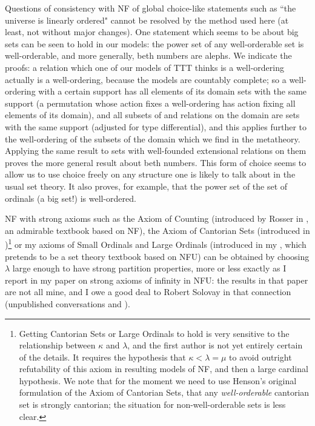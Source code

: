 \documentclass[112pt]{article}
\theoremstyle{definition}
\theoremstyle{remark}
\begin{document}
Questions of consistency with NF of global choice-like statements such as ``the universe is linearly ordered"  cannot be resolved by the method used here (at least, not without major changes).  One statement which seems to be about big sets can be seen to hold in our models:  the power set of any well-orderable set is well-orderable, and more generally, beth numbers are alephs.  We indicate the proofs:  a relation which one of our models of TTT thinks is a well-ordering actually is a well-ordering, because the models are countably complete;  so a well-ordering with a certain support has all elements of its domain sets with the same support (a permutation whose action fixes a well-ordering has action fixing all elements of its domain), and all subsets of and relations on the domain are sets with the same support (adjusted for type differential), and this applies further to the well-ordering of the subsets of the domain which we find in the metatheory.  Applying the same result to sets with well-founded extensional relations on them proves the more general result about beth numbers.  This form of choice seems to allow us to use choice freely on any structure one is likely to talk about in the usual set theory.  It also proves, for example, that the power set of the set of ordinals (a big set!) is well-ordered.

NF with strong axioms such as the Axiom of Counting (introduced by Rosser in \cite{rosser}, an admirable textbook based on NF), the Axiom of Cantorian Sets (introduced in \cite{henson})\footnote{Getting Cantorian Sets or Large Ordinals to hold is very sensitive to the relationship between $\kappa$ and $\lambda$, and the first author is not yet entirely certain of the details.  It requires the hypothesis that $\kappa<\lambda=\mu$ to avoid outright refutability of this axiom in resulting models of NF, and then a large cardinal hypothesis.  We note that for the moment we need to use Henson's original formulation of the Axiom of Cantorian Sets, that any {\em well-orderable\/} cantorian set is strongly cantorian;  the situation for non-well-orderable sets is less clear.} or my axioms of Small Ordinals and Large Ordinals (introduced in  my \cite{mybook}, which pretends to be a set theory textbook based on NFU) can be obtained by choosing $\lambda$ large enough to have strong partition properties, more or less exactly as I report in my paper \cite{strongaxioms} on strong axioms of infinity in NFU:  the results in that paper are not all mine, and I owe a good deal to Robert Solovay in that connection (unpublished conversations and \cite{nfub}).
\end{document}
